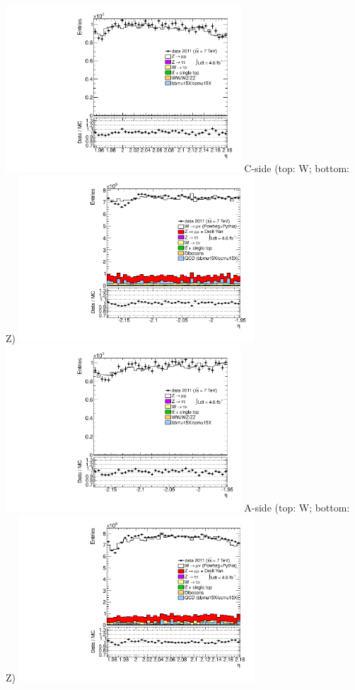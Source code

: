{\includegraphics[width=0.66\textwidth]{dates/20130306/figures/mu18/ZMU18_MG_10_A_stack_lN_eta_ALL.pdf} 
\cole
}
 {
\colb[T]
C-side (top: W; bottom: Z)
\centering
\includegraphics[width=0.66\textwidth]{dates/20130306/figures/mu18/WMU18_10_C_stack_l_eta_NEG} \\
\includegraphics[width=0.66\textwidth]{dates/20130306/figures/mu18/ZMU18_10_C_stack_lN_eta_ALL.pdf}
A-side (top: W; bottom: Z)
\centering
\includegraphics[width=0.66\textwidth]{dates/20130306/figures/mu18/WMU18_10_A_stack_l_eta_NEG} \\
}
